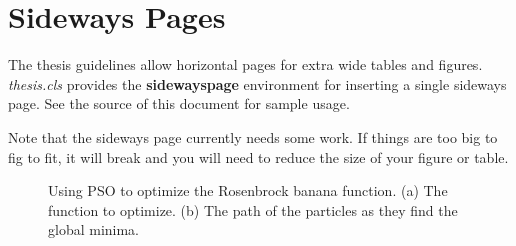 \documentclass[master]{thesis}
\begin{document}
\section{Sideways Pages}

The thesis guidelines allow horizontal pages for extra wide tables and figures.  \textit{thesis.cls} provides the \textbf{sidewayspage} environment for inserting a single sideways page.  See the source of this document for sample usage.

Note that the sideways page currently needs some work.  If things are too big to fig to fit, it will break and you will need to reduce the size of your figure or table.

\begin{sidewayspage} %
    \begin{figure} %
         \hfill
        \caption[PSO on sideways page.]{Using PSO to optimize the Rosenbrock banana function.  (a)  The function to optimize.  (b)  The path of the particles as they find the global minima.}
    \end{figure}
\end{sidewayspage}
\end{document}
